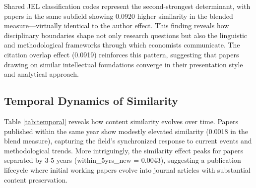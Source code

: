 \documentclass[12pt]{article}
\begin{document}
Shared JEL classification codes represent the second-strongest determinant, with papers in the same subfield showing 0.0920 higher similarity in the blended measure—virtually identical to the author effect. This finding reveals how disciplinary boundaries shape not only research questions but also the linguistic and methodological frameworks through which economists communicate. The citation overlap effect (0.0919) reinforces this pattern, suggesting that papers drawing on similar intellectual foundations converge in their presentation style and analytical approach.

\subsection{Temporal Dynamics of Similarity}

Table \ref{tab:temporal} reveals how content similarity evolves over time. Papers published within the same year show modestly elevated similarity (0.0018 in the blend measure), capturing the field's synchronized response to current events and methodological trends. More intriguingly, the similarity effect peaks for papers separated by 3-5 years (within\_5yrs\_new = 0.0043), suggesting a publication lifecycle where initial working papers evolve into journal articles with substantial content preservation.
\end{document}
